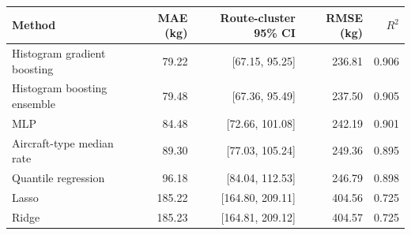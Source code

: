 \begin{tabular}{lrrrr}
\toprule
Method & MAE (kg) & Route-cluster 95\% CI & RMSE (kg) & $R^2$ \\
\midrule
Histogram gradient boosting & 79.22 & [67.15, 95.25] & 236.81 & 0.906 \\
Histogram boosting ensemble & 79.48 & [67.36, 95.49] & 237.50 & 0.905 \\
MLP & 84.48 & [72.66, 101.08] & 242.19 & 0.901 \\
Aircraft-type median rate & 89.30 & [77.03, 105.24] & 249.36 & 0.895 \\
Quantile regression & 96.18 & [84.04, 112.53] & 246.79 & 0.898 \\
Lasso & 185.22 & [164.80, 209.11] & 404.56 & 0.725 \\
Ridge & 185.23 & [164.81, 209.12] & 404.57 & 0.725 \\
\bottomrule
\end{tabular}
